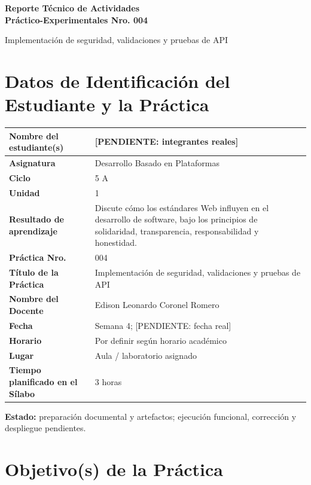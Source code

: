 \documentclass[11pt,a4paper]{article}
\begin{document}
\thispagestyle{fancy}
\begin{center}
{\bfseries\fontsize{21}{24}\selectfont Reporte Técnico de Actividades\\ Práctico-Experimentales Nro. 004\par}
\vspace{0.25cm}
{\large Implementación de seguridad, validaciones y pruebas de API}
\end{center}

\section{Datos de Identificación del Estudiante y la Práctica}
\begin{tabularx}{\textwidth}{|L{0.43\textwidth}|Y|}
\hline
\textbf{Nombre del estudiante(s)} & [PENDIENTE: integrantes reales] \\ \hline
\textbf{Asignatura} & Desarrollo Basado en Plataformas \\ \hline
\textbf{Ciclo} & 5 A \\ \hline
\textbf{Unidad} & 1 \\ \hline
\textbf{Resultado de aprendizaje} & Discute cómo los estándares Web influyen en el desarrollo de software, bajo los principios de solidaridad, transparencia, responsabilidad y honestidad. \\ \hline
\textbf{Práctica Nro.} & 004 \\ \hline
\textbf{Título de la Práctica} & Implementación de seguridad, validaciones y pruebas de API \\ \hline
\textbf{Nombre del Docente} & Edison Leonardo Coronel Romero \\ \hline
\textbf{Fecha} & Semana 4; [PENDIENTE: fecha real] \\ \hline
\textbf{Horario} & Por definir según horario académico \\ \hline
\textbf{Lugar} & Aula / laboratorio asignado \\ \hline
\textbf{Tiempo planificado en el Sílabo} & 3 horas \\ \hline
\end{tabularx}
\textbf{Estado:} preparación documental y artefactos; ejecución funcional, corrección y despliegue pendientes.\par

\section{Objetivo(s) de la
Práctica}\label{APE4-semana-4-objetivos-de-la-pruxe1ctica}
\end{document}
